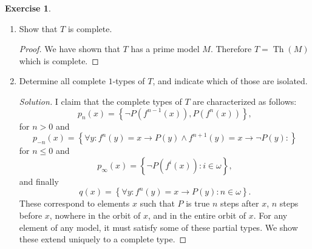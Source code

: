 \documentclass{article}
\renewcommand{\qedsymbol}{\raisebox{-0.5cm}{}}
\newcommand{\N}{\mathbb{N}}
\newcommand{\set}[1]{\left\{#1\right\}}
\newcommand{\setwith}[2]{\left\{#1:#2\right\}}
\DeclareMathOperator{\theory}{Th}
\newenvironment{solution}{\begin{proof}[Solution]\renewcommand\qedsymbol{}}{\end{proof}}
\theoremstyle{definition}
\newtheorem{question}{Exercise}
\begin{document}
\begin{question}
\begin{enumerate}[(1)]
\begin{proof}
                  Let \(N\) be any model of \(T\) and \(X\subseteq N\) the
                  infinite set elements \(x\) with \(N\not\models P(x)\) and
                  \(N\models P(f(x))\). Then there is an injective map
                  \(g:\setwith{0_{i}}{i\in\N}\to X\) because \(X\) is infinite.
                  This induces an embedding \(M\to N\): every \(n_{i}\in M\) is
                  \(f^{n}(0_{i})\) and so we send \(n_{i}\) to
                  \(f^{n}(g(0_{i}))\). This is an embedding because \(g\) is
                  injective and orbits of group actions are disjoint.

                  The embedding is automatically elementary by the above lemma.
              \end{proof}

        \item Show that \(T\) is complete.

              \begin{proof}
                  We have shown that \(T\) has a prime model \(M\). Therefore
                  \(T=\theory(M)\) which is complete.
              \end{proof}

        \item Determine all complete \(1\)-types of \(T\), and indicate which of
              those are isolated.

              \begin{solution}
                  I claim that the complete types of \(T\) are characterized as
                  follows:
                  \[
                      p_{n}(x)=\set{\neg P(f^{n-1}(x)),P(f^{n}(x))},
                  \]
                  for \(n>0\) and
                  \[
                      p_{-n}(x)=\setwith{\forall y:f^{n}(y)=x\to P(y)\wedge f^{n+1}(y)=x\to\neg P(y)}{}
                  \]
                  for \(n\leq 0\) and
                  \[
                      p_{\infty}(x)=\setwith{\neg P(f^{i}(x))}{i\in\omega},
                  \]
                  and finally
                  \[
                      q(x)=\setwith{\forall y:f^{n}(y)=x\to P(y)}{n\in\omega}.
                  \]
                  These correspond to elements \(x\) such that \(P\) is true
                  \(n\) steps after \(x\), \(n\) steps before \(x\), nowhere in
                  the orbit of \(x\), and in the entire orbit of \(x\). For any
                  element of any model, it must satisfy some of these partial
                  types. We show these extend uniquely to a complete type.


\end{solution}
\end{enumerate}
\end{question}
\end{document}
